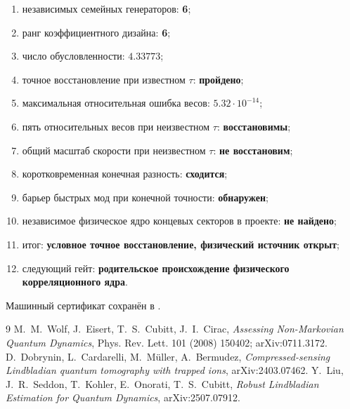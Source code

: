 \begin{protocol}
\begin{enumerate}
 \item независимых семейных генераторов: \textbf{6};
 \item ранг коэффициентного дизайна: \textbf{6};
 \item число обусловленности: \textbf{$4.33773$};
 \item точное восстановление при известном $\tau$: \textbf{пройдено};
 \item максимальная относительная ошибка весов: \textbf{$5.32\cdot10^{-14}$};
 \item пять относительных весов при неизвестном $\tau$: \textbf{восстановимы};
 \item общий масштаб скорости при неизвестном $\tau$: \textbf{не восстановим};
 \item коротковременная конечная разность: \textbf{сходится};
 \item барьер быстрых мод при конечной точности: \textbf{обнаружен};
 \item независимое физическое ядро концевых секторов в проекте: \textbf{не найдено};
 \item итог: \textbf{условное точное восстановление, физический источник открыт};
 \item следующий гейт: \textbf{родительское происхождение физического
 корреляционного ядра}.
\end{enumerate}
\end{protocol}

Машинный сертификат сохранён в
.

\begin{thebibliography}{9}
M.~M.~Wolf, J.~Eisert, T.~S.~Cubitt, J.~I.~Cirac,
\emph{Assessing Non-Markovian Quantum Dynamics},
Phys. Rev. Lett. 101 (2008) 150402; arXiv:0711.3172.
D.~Dobrynin, L.~Cardarelli, M.~M\"uller, A.~Bermudez,
\emph{Compressed-sensing Lindbladian quantum tomography with trapped ions},
arXiv:2403.07462.
Y.~Liu, J.~R.~Seddon, T.~Kohler, E.~Onorati, T.~S.~Cubitt,
\emph{Robust Lindbladian Estimation for Quantum Dynamics},
arXiv:2507.07912.
\end{thebibliography}